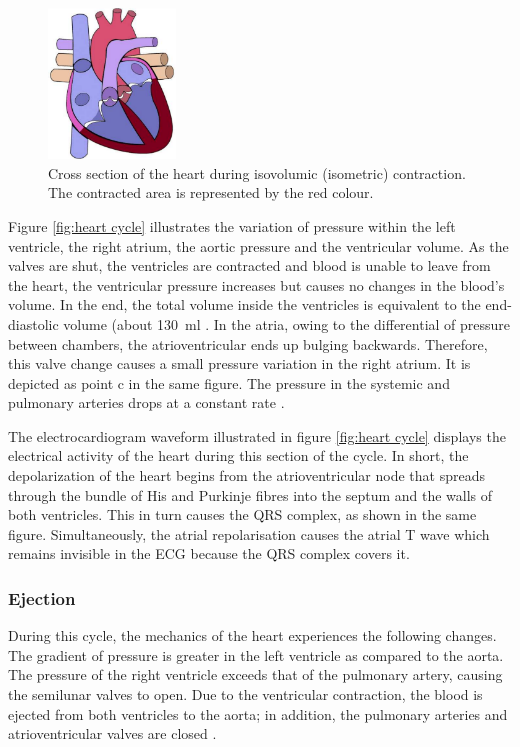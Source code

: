 \begin{figure}[!htpb]
	\centering
	\includegraphics[height=4cm,keepaspectratio]{figure_3}   
	\caption[Heart during isovolumic (isometric) contaction]{Cross section of the heart during isovolumic (isometric) contraction. The contracted area is represented by the red colour.}
	\label{fig:heart isovolumic}
\end{figure}

Figure \ref{fig:heart cycle} illustrates the variation of pressure within the left ventricle, the right atrium, the aortic pressure and the ventricular volume. As the valves are shut, the ventricles are contracted and blood is unable to leave from the heart, the ventricular pressure increases but causes no changes in the blood's volume. In the end, the total volume inside the ventricles is equivalent to the end-diastolic volume (about \SI{130}{\milli\litre} \cite{fukuta2008cardiac}. In the atria, owing to the differential of pressure between chambers, the atrioventricular ends up bulging backwards. Therefore, this valve change causes a small pressure variation in the right atrium. It is depicted as point c in the same figure. The pressure in the systemic and pulmonary arteries drops at a constant rate \cite{Hall:2015aa}. 

The electrocardiogram waveform illustrated in figure \ref{fig:heart cycle} displays the electrical activity of the heart during this section of the cycle. In short, the depolarization of the heart begins from the atrioventricular node that spreads through the bundle of His and Purkinje fibres into the septum and the walls of both ventricles. This in turn causes the QRS complex, as shown in the same figure. Simultaneously, the atrial repolarisation causes the atrial T wave which remains invisible in the ECG because the QRS complex covers it.


\subsubsection{Ejection}
During this cycle, the mechanics of the heart experiences the following changes. The gradient of pressure is greater in the left ventricle as compared to the aorta. The pressure of the right ventricle exceeds that of the pulmonary artery, causing the semilunar valves to open. Due to the ventricular contraction, the blood is ejected from both ventricles to the aorta; in addition, the pulmonary arteries and atrioventricular valves are closed \cite{Hall:2015aa}.


